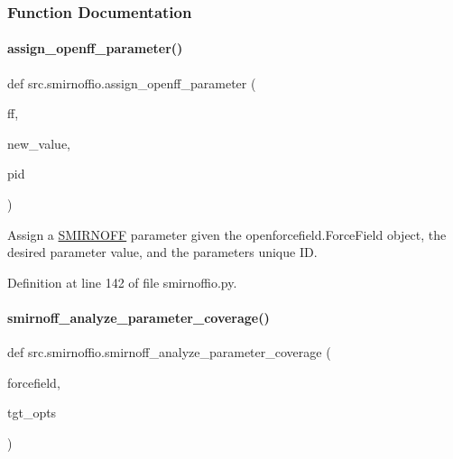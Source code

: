 \subsubsection{Function Documentation}
\mbox{\label{namespacesrc_1_1smirnoffio_aa6131a8e15712415535410609a0c9900}} 
\paragraph{\texorpdfstring{assign\+\_\+openff\+\_\+parameter()}{assign\_openff\_parameter()}}
{\footnotesize\ttfamily def src.\+smirnoffio.\+assign\+\_\+openff\+\_\+parameter (\begin{DoxyParamCaption}\item[{}]{ff,  }\item[{}]{new\+\_\+value,  }\item[{}]{pid }\end{DoxyParamCaption})}



Assign a \hyperlink{classsrc_1_1smirnoffio_1_1SMIRNOFF}{S\+M\+I\+R\+N\+O\+FF} parameter given the openforcefield.\+Force\+Field object, the desired parameter value, and the parameter\textquotesingle{}s unique ID. 



Definition at line 142 of file smirnoffio.\+py.

\mbox{\label{namespacesrc_1_1smirnoffio_a993b4343db1c9de5ef6358de38bc6493}} 
\paragraph{\texorpdfstring{smirnoff\+\_\+analyze\+\_\+parameter\+\_\+coverage()}{smirnoff\_analyze\_parameter\_coverage()}}
{\footnotesize\ttfamily def src.\+smirnoffio.\+smirnoff\+\_\+analyze\+\_\+parameter\+\_\+coverage (\begin{DoxyParamCaption}\item[{}]{forcefield,  }\item[{}]{tgt\+\_\+opts }\end{DoxyParamCaption})}



